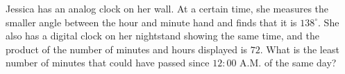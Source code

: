 Jessica has an analog clock on her wall. At a certain time, she measures the smaller angle between the hour and minute hand and finds that it is $138^\circ$. She also has a digital clock on her nightstand showing the same time, and the product of the number of minutes and hours displayed is $72$. What is the least number of minutes that could have passed since $12:00$ A.M. of the same day?
